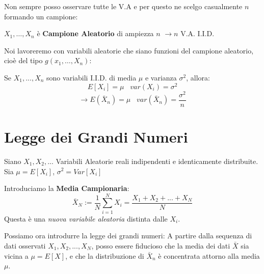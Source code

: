 Non sempre posso osservare tutte le V.A e per questo ne scelgo casualmente $n$ formando un campione: 
\begin{center}
    $X_1, \dots ,X_n$ è  \textbf{Campione Aleatorio} di ampiezza $n$ $\to n$ V.A. I.I.D. 
\end{center}
Noi lavoreremo con variabili aleatorie che siano funzioni del 
campione aleatorio, cioè del tipo $g(x_1, \dots ,X_n)$:

Se $X_1,...,X_n$ sono variabili I.I.D. di media $\mu$ e varianza $\sigma^2$, allora:
\[ E[X_i] = \mu \;\;\; var(X_i) = \sigma^2 \]
\[ \to E(\bar{X}_n) = \mu  \;\;\; var(\bar{X}_n) = \frac{\sigma^2}{n} \]


\section{Legge dei Grandi Numeri}
Siano $X_1,X_2,...$ Variabili Aleatorie reali indipendenti e identicamente distribuite.
\\Sia $\mu = E[X_i]$, $\sigma^2 = Var[X_i]$

Introduciamo la \textbf{Media Campionaria}:
\[ \bar{X}_N  := \frac{1}{N} \sum_{i=1}^N X_i = \frac{X_1+X_2+ ... + X_N}{N}\]
Questa è una \emph{nuova variabile aleatoria} distinta dalle $X_i$.

Possiamo ora introdurre la legge dei grandi numeri:
A partire dalla sequenza di dati osservati $X_1,X_2,...,X_N$, posso essere fiducioso che la media dei dati
$\bar{X}$ sia vicina a $\mu = E[X]$, e che la distribuzione di $\bar{X}_n$ è concentrata attorno alla media $\mu$.

